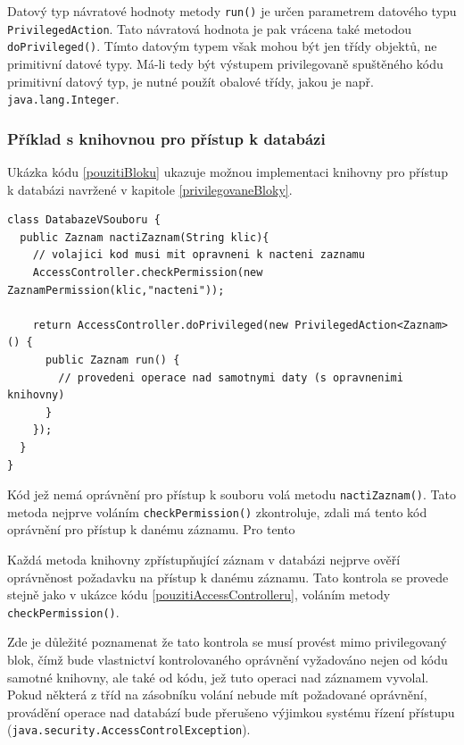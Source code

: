 Datový typ návratové hodnoty metody {\tt run()} je určen parametrem datového typu {\tt PrivilegedAction}.
Tato návratová hodnota je pak vrácena také metodou {\tt doPrivileged()}.
Tímto datovým typem však mohou být jen třídy objektů, ne primitivní datové typy.
Má-li tedy být výstupem privilegovaně spuštěného kódu primitivní datový typ, je nutné použít obalové třídy, jakou je např. {\tt java.lang.Integer}.

\subsubsection{Příklad s knihovnou pro přístup k databázi}\label{databazeVsouboru}

Ukázka kódu \ref{pouzitiBloku} ukazuje možnou implementaci knihovny pro přístup k databázi navržené v kapitole \ref{privilegovaneBloky}.

\begin{lstlisting}[caption=Demonstrační knihovna pro přístup k databázi, label=pouzitiBloku]
class DatabazeVSouboru {
  public Zaznam nactiZaznam(String klic){
    // volajici kod musi mit opravneni k nacteni zaznamu
    AccessController.checkPermission(new ZaznamPermission(klic,"nacteni"));
    
    return AccessController.doPrivileged(new PrivilegedAction<Zaznam>() {
      public Zaznam run() {
        // provedeni operace nad samotnymi daty (s opravnenimi knihovny)
      }
    });
  }
}
\end{lstlisting}

Kód jež nemá oprávnění pro přístup k souboru volá metodu {\tt nactiZaznam()}.
Tato metoda nejprve voláním {\tt checkPermission()} zkontroluje, zdali má tento kód oprávnění pro přístup k danému záznamu.
Pro tento 


Každá metoda knihovny zpřístupňující záznam v databázi nejprve ověří oprávněnost požadavku na přístup k danému záznamu. Tato kontrola se provede stejně jako v ukázce kódu \ref{pouzitiAccessControlleru}, voláním metody {\tt checkPermission()}.

Zde je důležité poznamenat že tato kontrola se musí provést mimo privilegovaný blok, čímž bude vlastnictví kontrolovaného oprávnění vyžadováno nejen od kódu samotné knihovny, ale také od kódu, jež tuto operaci nad záznamem vyvolal. Pokud některá z tříd na zásobníku volání nebude mít požadované oprávnění, provádění operace nad databází bude přerušeno výjimkou systému řízení přístupu ({\tt java.security.AccessControlException}).

